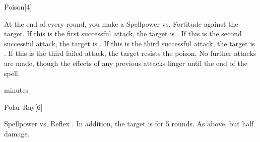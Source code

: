 \begin{spellsection}{Poison}[4]
    \begin{spellheader}
    \end{spellheader}
    \begin{spellcontent}
        \begin{spelltargetinginfo}
        \end{spelltargetinginfo}
        \begin{spelleffects}
            \begin{spellattacktriggered}{At the end of every round, you make a Spellpower vs. Fortitude against the target.}
                \spellsuccess If this is the first successful attack, the target is \sickened. If this is the second successful attack, the target is \nauseated. If this is the third successful attack, the target is \paralyzed.
                \spellfailure If this is the third failed attack, the target resists the poison. No further attacks are made, though the effects of any previous attacks linger until the end of the spell.
            \end{spellattacktriggered}
             minutes
        \end{spelleffects}
    \end{spellcontent}
    \begin{spellfooter}
        \spellnotes \physicalspellnotes
        \miscastrandom
    \end{spellfooter}
\end{spellsection}

\begin{spellsection}{Polar Ray}[6]
    \begin{spellheader}
    \end{spellheader}
    \begin{spellcontent}
        \begin{spelltargetinginfo}
        \end{spelltargetinginfo}
        \begin{spelleffects}
            \begin{spellattack}{Spellpower vs. Reflex}
                \spellsuccess {}. In addition, the target is \slowed for 5 rounds.
                \spellfailure As above, but half damage.
            \end{spellattack}
        \end{spelleffects}
    \end{spellcontent}
    \begin{spellfooter}
        \miscastrandom
    \end{spellfooter}
\end{spellsection}

